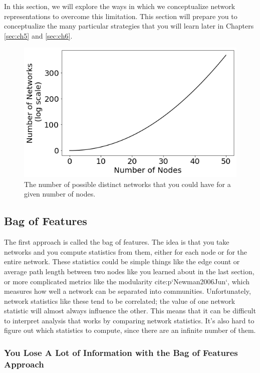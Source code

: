 In this section, we will explore the ways in which we conceptualize network representations to overcome this limitation. This section will prepare you to conceptualize the many particular strategies that you will learn later in Chapters \ref{sec:ch5} and \ref{sec:ch6}.

\begin{figure}[h]
    \centering
    \includegraphics[width=0.7\linewidth]{representations/ch4/Images/nnets.png}
    \caption[Number of networks for $n$ nodes]{The number of possible distinct networks that you could have for a given number of nodes.}
    \label{fig:ch4:nnets}
\end{figure}

\subsection{Bag of Features}

The first approach is called the bag of features. The idea is that you take networks and you compute statistics from them, either for each node or for the entire network. These statistics could be simple things like the edge count or average path length between two nodes like you learned about in the last section, or more complicated metrics like the modularity {cite:p}`Newman2006Jun`, which measures how well a network can be separated into communities. Unfortunately, network statistics like these tend to be correlated; the value of one network statistic will almost always influence the other. This means that it can be difficult to interpret analysis that works by comparing network statistics. It's also hard to figure out which statistics to compute, since there are an infinite number of them.

\subsubsection{You Lose A Lot of Information with the Bag of Features Approach}

